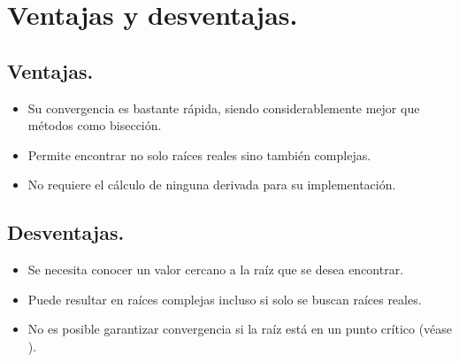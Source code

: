 \section{Ventajas y desventajas.}
\subsection{Ventajas.}
\begin{itemize}
    \item Su convergencia es bastante rápida, siendo considerablemente mejor que métodos como bisección.
    \item Permite encontrar no solo raíces reales sino también complejas.
    \item No requiere el cálculo de ninguna derivada para su implementación.
\end{itemize}
\subsection{Desventajas.}
\begin{itemize}
    \item Se necesita conocer un valor cercano a la raíz que se desea encontrar.
    \item Puede resultar en raíces complejas incluso si solo se buscan raíces reales.
    \item No es posible garantizar convergencia si la raíz está en un punto crítico (véase ).
\end{itemize}